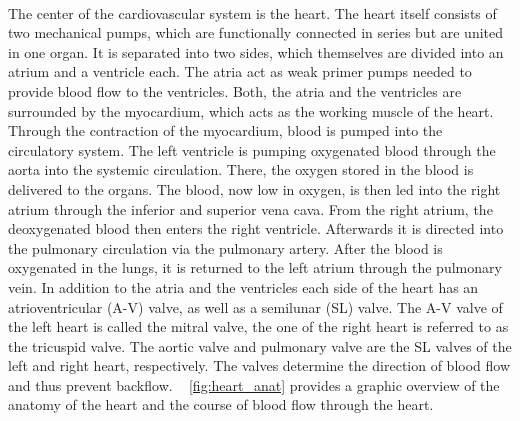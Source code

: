  \\The center of the cardiovascular system is the heart. The heart itself consists of two mechanical pumps, which are functionally connected in series but are united in one organ. It is separated into two sides, which themselves are divided into an atrium and a ventricle each. The atria act as weak primer pumps needed to provide blood flow to the ventricles.\cite{HKS4} Both, the atria and the ventricles are surrounded by the myocardium, which acts as the working muscle of the heart. Through the contraction of the myocardium, blood is pumped into the circulatory system.\cite{HKS7} The left ventricle is pumping oxygenated blood through the aorta into the systemic circulation. There, the oxygen stored in the blood is delivered to the organs. The blood, now low in oxygen, is then led into the right atrium through the inferior and superior vena cava. From the right atrium, the deoxygenated blood then enters the right ventricle. Afterwards it is directed into the pulmonary circulation via the pulmonary artery. After the blood is oxygenated in the lungs, it is returned to the left atrium through the pulmonary vein.\cite{HKS4} In addition to the atria and the ventricles each side of the heart has an atrioventricular (A-V) valve, as well as a semilunar (SL) valve. The A-V valve of the left heart is called the mitral valve, the one of the right heart is referred to as the tricuspid valve. The aortic valve and pulmonary valve are the SL valves of the left and right heart, respectively. The valves determine the direction of blood flow and thus prevent backflow. \cite{HKS7} \figurename~ \ref{fig:heart_anat} provides a graphic overview of the anatomy of the heart and the course of blood flow through the heart.

